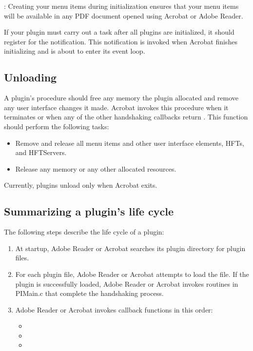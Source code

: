 \documentclass[letterpaper,12pt,english,openany,oneside]{sphinxmanual}
\begin{document}
: Creating your menu items during initialization ensures that your menu items will be available in any PDF document opened using Acrobat or Adobe Reader.

If your plugin must carry out a task after all plugins are initialized, it should register for the  notification. This notification is invoked when Acrobat finishes initializing and is about to enter its event loop.


\subsection{Unloading}
\label{\detokenize{Plugins_Pimech:unloading}}
A plugin’s  procedure should free any memory the plugin allocated and remove any user interface changes it made. Acrobat invokes this procedure when it terminates or when any of the other handshaking callbacks return . This function should perform the following tasks:
\begin{itemize}
\item {} 
Remove and release all menu items and other user interface elements, HFTs, and HFTServers.

\item {} 
Release any memory or any other allocated resources.

\end{itemize}

Currently, plugins unload only when Acrobat exits.


\subsection{Summarizing a plugin’s life cycle}
\label{\detokenize{Plugins_Pimech:summarizing-a-plugin-s-life-cycle}}
The following steps describe the life cycle of a plugin:
\begin{enumerate}
%
\item {} 
At startup, Adobe Reader or Acrobat searches its plugin directory for plugin files.

\item {} 
For each plugin file, Adobe Reader or Acrobat attempts to load the file. If the plugin is successfully loaded, Adobe Reader or Acrobat invokes routines in PIMain.c that complete the handshaking process.

\item {} 
Adobe Reader or Acrobat invokes callback functions in this order:
\begin{itemize}
\item {} 

\item {} 

\item {} 

\end{itemize}

\end{enumerate}
\end{document}
